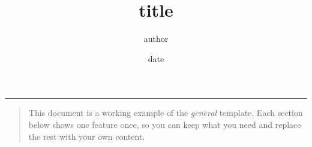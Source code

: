 \documentclass[a4paper,11pt]{article}
\title{{{title}}}
\author{{{author}}}
\date{{{date}}}
\makeatletter
\renewcommand{\maketitle}{\begingroup\raggedright
  {\fontsize{28}{32}\selectfont\color{editorialink}\@title\par}\vspace{8pt}
  {\color{editorialmark}\rule{22mm}{2pt}\par}\vspace{6pt}
  {\itshape\color{editorialmuted}\@author\quad\@date\par}\vspace{14pt}\endgroup}
\renewenvironment{abstract}
{\begin{quote}\small{\scshape\bfseries\color{editorialaccent}\abstractname}\quad\ignorespaces}
  {\end{quote}}
\makeatother
\begin{document}
  \maketitle

  \begin{abstract}
    This document is a working example of the \textit{general} template. Each
    section below shows one feature once, so you can keep what you need and
    replace the rest with your own content.
  \end{abstract}

  

  
  
\end{document}
